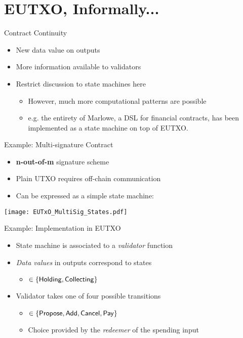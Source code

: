 \section{EUTXO, Informally...}

\begin{frame}{Contract Continuity}
\begin{itemize}
\item New data value on outputs
\item More information available to validators
\item Restrict discussion to state machines here
  \begin{itemize}
  \item However, much more computational patterns are possible
  \item e.g. the entirety of \alert{Marlowe}, a DSL for financial contracts, has
been implemented as a state machine on top of EUTXO.
  \end{itemize}
\end{itemize}
\end{frame}

\begin{frame}{Example: Multi-signature Contract}

\begin{itemize}
\item \textbf{n-out-of-m} signature scheme
\item Plain UTXO requires off-chain communication
\item Can be expressed as a simple state machine:
\end{itemize}

\centering
\texttt{[image: EUTxO\_MultiSig\_States.pdf]}

\end{frame}

\begin{frame}{Example: Implementation in EUTXO}

\begin{itemize}
\item State machine is associated to a \textit{validator} function
\item \textit{Data values} in outputs correspond to states
  \begin{itemize}
  \item $\in \{ \mathsf{Holding} , \mathsf{Collecting} \}$
  \end{itemize}
\item Validator takes one of four possible transitions
  \begin{itemize}
  \item $\in \{ \mathsf{Propose} , \mathsf{Add} , \mathsf{Cancel} , \mathsf{Pay} \}$
  \item Choice provided by the \textit{redeemer} of the spending input
  \end{itemize}
\end{itemize}

\end{frame}

